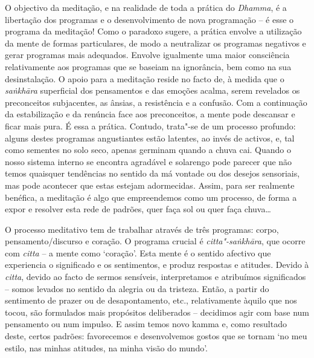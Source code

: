 O objectivo da meditação, e na realidade de toda a prática do \emph{Dhamma}, é a
libertação dos programas e o desenvolvimento de nova programação -- é esse o
programa da meditação! Como o paradoxo sugere, a prática envolve a utilização da
mente de formas particulares, de modo a neutralizar os programas negativos e
gerar programas mais adequados. Envolve igualmente uma maior consciência
relativamente aos programas que se baseiam na ignorância, bem como na sua
desinstalação. O apoio para a meditação reside no facto de, à medida que o
\emph{saṅkhāra} superficial dos pensamentos e das emoções acalma, serem
revelados os preconceitos subjacentes, as ânsias, a resistência e a confusão.
Com a continuação da estabilização e da renúncia face aos preconceitos, a mente
pode descansar e ficar mais pura. É essa a prática. Contudo, trata"-se de um
processo profundo: alguns destes programas angustiantes estão latentes, ao invés
de activos, e, tal como sementes no solo seco, apenas germinam quando a chuva
cai. Quando o nosso sistema interno se encontra agradável e solarengo pode
parecer que não temos quaisquer tendências no sentido da má vontade ou dos
desejos sensoriais, mas pode acontecer que estas estejam adormecidas. Assim,
para ser realmente benéfica, a meditação é algo que empreendemos como um
processo, de forma a expor e resolver esta rede de padrões, quer faça sol ou
quer faça chuva\ldots{}

O processo meditativo tem de trabalhar através de três programas: corpo,
pensamento/discurso e coração.
O programa crucial é \emph{citta"-saṅkhāra}, que ocorre com \emph{citta} -- a
mente como `coração'. Esta mente é o sentido afectivo que experiencia o
significado e os sentimentos, e produz respostas e atitudes. Devido à
\emph{citta}, devido ao facto de sermos sensíveis, interpretamos e atribuímos
significados -- somos levados no sentido da alegria ou da tristeza. Então, a
partir do sentimento de prazer ou de desapontamento, etc., relativamente àquilo
que nos tocou, são formulados mais propósitos deliberados -- decidimos agir com
base num pensamento ou num impulso. E assim temos novo kamma e, como resultado
deste, certos padrões: favorecemos e desenvolvemos gostos que se tornam `no meu
estilo, nas minhas atitudes, na minha visão do mundo'.   

